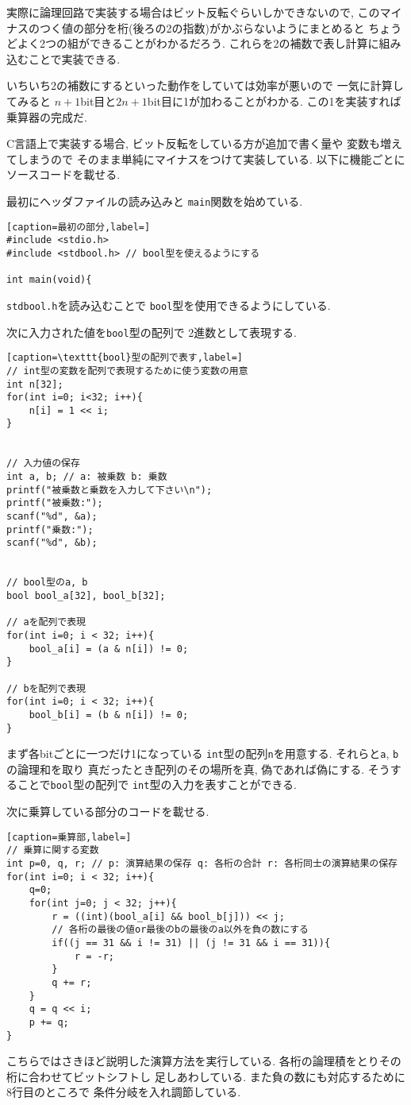 \documentclass[a4paper, xelatex, ja=standard]{bxjsarticle}
\begin{document}
実際に論理回路で実装する場合はビット反転ぐらいしかできないので,
このマイナスのつく値の部分を桁(後ろの2の指数)がかぶらないようにまとめると
ちょうどよく2つの組ができることがわかるだろう.
これらを2の補数で表し計算に組み込むことで実装できる.

いちいち2の補数にするといった動作をしていては効率が悪いので
一気に計算してみると
$n+1$bit目と$2n+1$bit目に1が加わることがわかる.
この1を実装すれば乗算器の完成だ.

C言語上で実装する場合,
ビット反転をしている方が追加で書く量や
変数も増えてしまうので
そのまま単純にマイナスをつけて実装している.
以下に機能ごとにソースコードを載せる.

最初にヘッダファイルの読み込みと
\texttt{main}関数を始めている.
\begin{lstlisting}[caption=最初の部分,label=]
#include <stdio.h>
#include <stdbool.h> // bool型を使えるようにする

int main(void){
\end{lstlisting}
\texttt{stdbool.h}を読み込むことで
\texttt{bool}型を使用できるようにしている.

次に入力された値を\texttt{bool}型の配列で
2進数として表現する.
\begin{lstlisting}[caption=\texttt{bool}型の配列で表す,label=]
// int型の変数を配列で表現するために使う変数の用意
int n[32];
for(int i=0; i<32; i++){
	n[i] = 1 << i;
}


// 入力値の保存
int a, b; // a: 被乗数 b: 乗数
printf("被乗数と乗数を入力して下さい\n");
printf("被乗数:");
scanf("%d", &a);
printf("乗数:");
scanf("%d", &b);


// bool型のa, b
bool bool_a[32], bool_b[32];

// aを配列で表現
for(int i=0; i < 32; i++){
	bool_a[i] = (a & n[i]) != 0;
}

// bを配列で表現
for(int i=0; i < 32; i++){
	bool_b[i] = (b & n[i]) != 0;
}
\end{lstlisting}
まず各bitごとに一つだけ1になっている
\texttt{int}型の配列\texttt{n}を用意する.
それらと\texttt{a}, \texttt{b}の論理和を取り
真だったとき配列のその場所を真, 偽であれば偽にする.
そうすることで\texttt{bool}型の配列で
\texttt{int}型の入力を表すことができる.

次に乗算している部分のコードを載せる.
\begin{lstlisting}[caption=乗算部,label=]
// 乗算に関する変数
int p=0, q, r; // p: 演算結果の保存 q: 各桁の合計 r: 各桁同士の演算結果の保存
for(int i=0; i < 32; i++){
	q=0;
	for(int j=0; j < 32; j++){
		r = ((int)(bool_a[i] && bool_b[j])) << j;
		// 各桁の最後の値or最後のbの最後のa以外を負の数にする
		if((j == 31 && i != 31) || (j != 31 && i == 31)){
			r = -r;
		}
		q += r;
	}
	q = q << i;
	p += q;
}
\end{lstlisting}
こちらではさきほど説明した演算方法を実行している.
各桁の論理積をとりその桁に合わせてビットシフトし
足しあわしている.
また負の数にも対応するために8行目のところで
条件分岐を入れ調節している.
\end{document}
